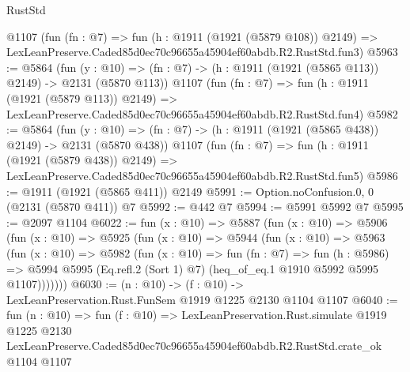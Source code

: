\begin{lexlean}{RustStd}
\begin{coremodule}
    @1107
    (fun (fn : @7) =>
    fun (h : @1911 (@1921 (@5879 @108)) @2149) =>
    LexLeanPreserve.Caded85d0ec70c96655a45904ef60abdb.R2.RustStd.fun3)
@5963 := @5864
    (fun (y : @10) => (fn : @7) -> (h : @1911 (@1921 (@5865 @113)) @2149) -> @2131 (@5870 @113))
    @1107
    (fun (fn : @7) =>
    fun (h : @1911 (@1921 (@5879 @113)) @2149) =>
    LexLeanPreserve.Caded85d0ec70c96655a45904ef60abdb.R2.RustStd.fun4)
@5982 := @5864
    (fun (y : @10) => (fn : @7) -> (h : @1911 (@1921 (@5865 @438)) @2149) -> @2131 (@5870 @438))
    @1107
    (fun (fn : @7) =>
    fun (h : @1911 (@1921 (@5879 @438)) @2149) =>
    LexLeanPreserve.Caded85d0ec70c96655a45904ef60abdb.R2.RustStd.fun5)
@5986 := @1911 (@1921 (@5865 @411)) @2149
@5991 := Option.noConfusion.{0, 0} (@2131 (@5870 @411)) @7
@5992 := @442 @7
@5994 := @5991 @5992 @7
@5995 := @2097 @1104
@6022 := fun (x : @10) =>
  @5887
    (fun (x : @10) =>
    @5906
      (fun (x : @10) =>
      @5925
        (fun (x : @10) =>
        @5944
          (fun (x : @10) =>
          @5963
            (fun (x : @10) =>
            @5982
              (fun (x : @10) =>
              fun (fn : @7) =>
              fun (h : @5986) =>
              @5994 @5995 (Eq.refl.{2} (Sort 1) @7) (heq_of_eq.{1} @1910 @5992 @5995 @1107)))))))
@6030 := (n : @10) -> (f : @10) -> LexLeanPreservation.Rust.FunSem @1919 @1225 @2130 @1104 @1107
@6040 := fun (n : @10) =>
  fun (f : @10) =>
  LexLeanPreservation.Rust.simulate
    @1919
    @1225
    @2130
    LexLeanPreserve.Caded85d0ec70c96655a45904ef60abdb.R2.RustStd.crate_ok
    @1104
    @1107
\end{coremodule}
\end{lexlean}
